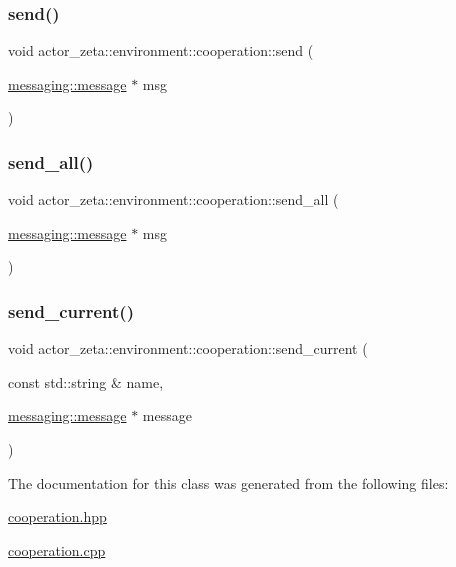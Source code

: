 \subsubsection{\texorpdfstring{send()}{send()}}
{\footnotesize\ttfamily void actor\+\_\+zeta\+::environment\+::cooperation\+::send (\begin{DoxyParamCaption}\item[{\hyperlink{classactor__zeta_1_1messaging_1_1message}{messaging\+::message} $\ast$}]{msg }\end{DoxyParamCaption})}

\mbox{\label{classactor__zeta_1_1environment_1_1cooperation_a5a3c222e844a74ea0c1eadef8531b550}} 
\subsubsection{\texorpdfstring{send\+\_\+all()}{send\_all()}}
{\footnotesize\ttfamily void actor\+\_\+zeta\+::environment\+::cooperation\+::send\+\_\+all (\begin{DoxyParamCaption}\item[{\hyperlink{classactor__zeta_1_1messaging_1_1message}{messaging\+::message} $\ast$}]{msg }\end{DoxyParamCaption})}

\mbox{\label{classactor__zeta_1_1environment_1_1cooperation_ae2f3dd43fe394ac0a3f16fb4291a84a5}} 
\subsubsection{\texorpdfstring{send\+\_\+current()}{send\_current()}}
{\footnotesize\ttfamily void actor\+\_\+zeta\+::environment\+::cooperation\+::send\+\_\+current (\begin{DoxyParamCaption}\item[{const std\+::string \&}]{name,  }\item[{\hyperlink{classactor__zeta_1_1messaging_1_1message}{messaging\+::message} $\ast$}]{message }\end{DoxyParamCaption})}



The documentation for this class was generated from the following files\+:\begin{DoxyCompactItemize}
\item 
\hyperlink{cooperation_8hpp}{cooperation.\+hpp}\item 
\hyperlink{cooperation_8cpp}{cooperation.\+cpp}\end{DoxyCompactItemize}
